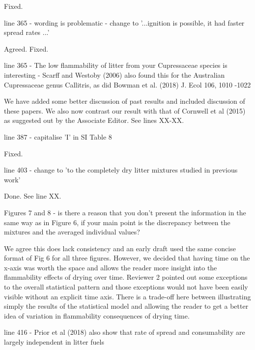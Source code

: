 \documentclass[letterpaper, 12pt]{letter}
\begin{document}
\begin{letter}{}
Fixed.

\begin{quoting}
  line 365 - wording is problematic - change to '...ignition is possible, it
  had faster spread rates ...'
\end{quoting}

Agreed. Fixed. 

\begin{quoting}
  line 365 - The low flammability of litter from your Cupressaceae species is
  interesting - Scarff and Westoby (2006) also found this for the Australian
  Cupressaceae genus Callitris, as did Bowman et al. (2018) J. Ecol 106, 1010
  -1022
\end{quoting}

We have added some better discussion of past results and included discussion of
these papers. We also now contrast our result with that of Cornwell et al
(2015) as suggested out by the Associate Editor. See lines XX-XX.

\begin{quoting}
line 387 - capitalise 'I' in SI Table  8
\end{quoting}

Fixed.

\begin{quoting}
line 403 - change to 'to the completely dry litter mixtures studied in previous work'
\end{quoting}

Done. See line XX.

\begin{quoting}
  Figures 7 and 8 - is there a reason that you don't present the information in
  the same way as in Figure 6, if your main point is the discrepancy between
  the mixtures and the averaged individual values?
\end{quoting}

We agree this does lack consistency and an early draft used the same concise
format of Fig 6 for all three figures. However, we decided that having time on
the x-axis was worth the space and allows the reader more insight into the
flammability effects of drying over time. Reviewer 2 pointed out some
exceptions to the overall statistical pattern and those exceptions would not
have been easily visible without an explicit time axis. There is a trade-off
here between illustrating simply the results of the statistical model and
allowing the reader to get a better idea of variation in flammability
consequences of drying time.

\begin{quoting}
  line 416 - Prior et al (2018) also show that rate of spread and consumability
  are largely independent in litter fuels
\end{quoting}


\end{letter}
\end{document}
